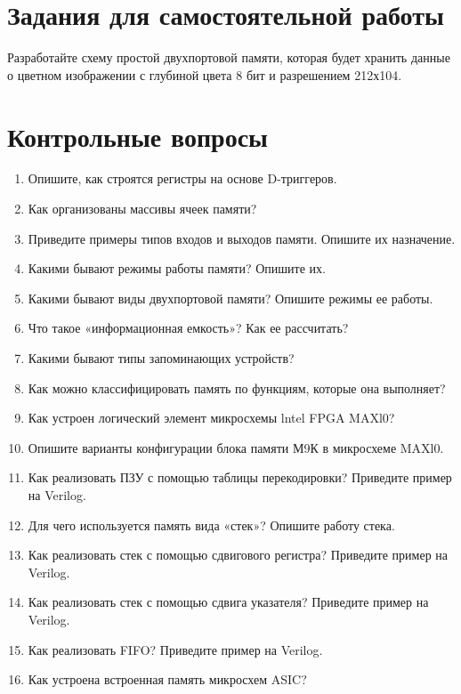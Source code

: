 \documentclass[a4paper,14pt]{article}
\begin{document}
	
	\section{Задания для самостоятельной работы}
	
	Разработайте схему простой двухпортовой памяти, которая будет хранить данные о
	цветном изображении с глубиной цвета 8 бит и разрешением 212х104.
			
	\section{Контрольные вопросы}
	
	\begin{enumerate}
		\item Опишите, как строятся регистры на основе D-триггеров.
		
		\item Как организованы массивы ячеек памяти?
		
		\item Приведите примеры типов входов и выходов памяти. Опишите их назначение.
		
		\item Какими бывают режимы работы памяти? Опишите их.
		
		\item Какими бывают виды двухпортовой памяти? Опишите режимы ее работы.
		
		\item Что такое «информационная емкость»? Как ее рассчитать?
		
		\item Какими бывают типы запоминающих устройств?
		
		\item Как можно классифицировать память по функциям, которые она выполняет?
		
		\item Как устроен логический элемент микросхемы lntel FPGA MAXl0?
		
		\item Опишите варианты конфигурации блока памяти М9К в микросхеме MAXl0.
		
		\item Как реализовать ПЗУ с помощью таблицы перекодировки? Приведите пример на Verilog.
		
		\item Для чего используется память вида «стек»? Опишите работу стека.
		
		\item Как реализовать стек с помощью сдвигового регистра? Приведите пример на Verilog.
		
		\item Как реализовать стек с помощью сдвига указателя? Приведите пример на Verilog.
		
		\item Как реализовать FIFO? Приведите пример на Verilog.
		
		\item Как устроена встроенная память микросхем ASIC?
	\end{enumerate}
	
\end{document}
